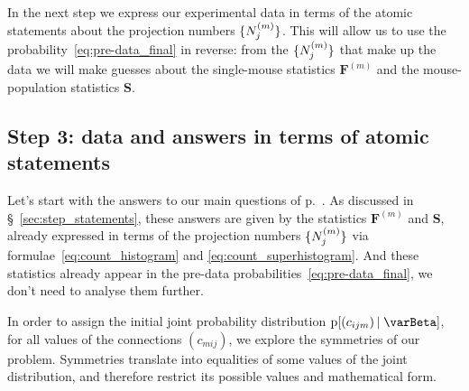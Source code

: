 \documentclass[\ifafour a4paper,12pt,\else a5paper,10pt,\fi%
onecolumn,oneside,article,%
british%
]{memoir}
\theoremstyle{remark}
\theoremstyle{innote}
\newcommand*{\pf}{\mathrm{p}}%
\renewcommand*{\|}[1][]{\nonscript\,#1\vert\nonscript\;\mathopen{}}
\newcommand*{\sect}{\S}%
\newcommand*{\yI}{\varBeta}
\newcommand*{\yc}{c}
\newcommand*{\yF}{\bm{F}}
\newcommand*{\yFm}[1][m]{\yF^{(#1)}}
\newcommand*{\yNm}[1][m]{N^{(#1)}}
\newcommand*{\ySS}{S}
\newcommand*{\yS}{\bm{\ySS}}
\DeclarePairedDelimiter\tu{\{}{\}}
\begin{document}
\medskip

In the next step we express our experimental data in terms of the atomic
statements about the projection numbers $\tu{\yNm_{j}}$. This will allow us to
use the probability~\eqref{eq:pre-data_final} in reverse: from the
$\tu{\yNm_{j}}$ that make up the data we will make guesses about the
single-mouse statistics $\yFm$ and the mouse-population statistics $\yS$.

\subsection{Step 3: data and answers in terms of atomic statements}
\label{sec:data_as_atomic}

Let's start with the answers to our main questions of
p.~\pageref{item:Qindiv}. As discussed in \sect~\ref{sec:step_statements},
these answers are given by the statistics $\yFm$ and $\yS$, already
expressed in terms of the projection numbers $\tu{\yNm_{j}}$ via
formulae~\eqref{eq:count_histogram} and \eqref{eq:count_superhistogram}.
And these statistics already appear in the pre-data
probabilities~\eqref{eq:pre-data_final}, we don't need to analyse them
further.






In order to assign the initial joint probability distribution
$\pf[(\yc_{ijm}) \| \yI]$, for all values of the connections $(\yc_{mij})$,
we explore the symmetries of our problem. Symmetries translate into
equalities of some values of the joint distribution, and therefore restrict
its possible values and mathematical form.
\end{document}
